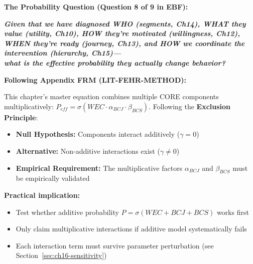 \begin{tcolorbox}[colback=red!10!white, colframe=red!75!black, title=Central Question of Chapter 16]
\textbf{The Probability Question (Question 8 of 9 in EBF):}

\Large\textbf{\textit{Given that we have diagnosed WHO (segments, Ch14), WHAT they value (utility, Ch10), HOW they're motivated (willingness, Ch12), WHEN they're ready (journey, Ch13), and HOW we coordinate the intervention (hierarchy, Ch15)---\\[8pt]what is the effective probability they actually change behavior?}}

\end{tcolorbox}

\begin{tcolorbox}[colback=red!5!white, colframe=red!75!black,
    title=\textbf{Methodological Note: The Exclusion Principle (Appendix FRM)}]
\textbf{Following Appendix FRM (LIT-FEHR-METHOD):}

This chapter's master equation combines multiple CORE components multiplicatively: $P_{eff} = \sigma(WEC \cdot \alpha_{BCJ} \cdot \beta_{BCS})$. Following the \textbf{Exclusion Principle}:
\begin{itemize}[nosep]
    \item \textbf{Null Hypothesis:} Components interact additively ($\gamma = 0$)
    \item \textbf{Alternative:} Non-additive interactions exist ($\gamma \neq 0$)
    \item \textbf{Empirical Requirement:} The multiplicative factors $\alpha_{BCJ}$ and $\beta_{BCS}$ must be empirically validated
\end{itemize}

\textbf{Practical implication:}
\begin{itemize}[nosep]
    \item Test whether additive probability $P = \sigma(WEC + BCJ + BCS)$ works first
    \item Only claim multiplicative interactions if additive model systematically fails
    \item Each interaction term must survive parameter perturbation (see Section~\ref{sec:ch16-sensitivity})
\end{itemize}
\end{tcolorbox}

